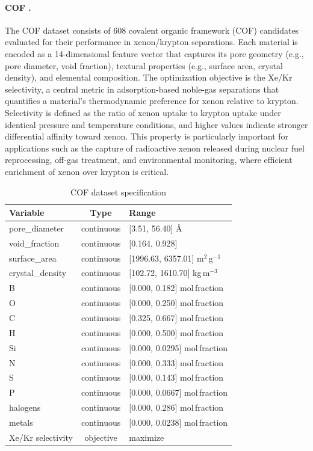 \documentclass{article} %
\begin{document}
\paragraph{COF \citep{cof}.}
The COF dataset consists of 608 covalent organic framework (COF) candidates evaluated for their performance in xenon/krypton separations. Each material is encoded as a 14-dimensional feature vector that captures its pore geometry (e.g., pore diameter, void fraction), textural properties (e.g., surface area, crystal density), and elemental composition. The optimization objective is the Xe/Kr selectivity, a central metric in adsorption-based noble-gas separations that quantifies a material's thermodynamic preference for xenon relative to krypton. Selectivity is defined as the ratio of xenon uptake to krypton uptake under identical pressure and temperature conditions, and higher values indicate stronger differential affinity toward xenon. This property is particularly important for applications such as the capture of radioactive xenon released during nuclear fuel reprocessing, off-gas treatment, and environmental monitoring, where efficient enrichment of xenon over krypton is critical.

\begin{table}[h]
\centering
\caption{COF dataset specification}
\begin{tabular}{lcl}
\toprule
Variable & Type & Range \\
\midrule
pore\_diameter    & continuous & [3.51, 56.40] \AA \\
void\_fraction    & continuous & [0.164, 0.928]\\
surface\_area     & continuous & [1996.63, 6357.01] m$^{2}$\,g$^{-1}$ \\
crystal\_density  & continuous & [102.72, 1610.70] kg\,m$^{-3}$ \\
B                 & continuous & [0.000, 0.182] mol\,fraction \\
O                 & continuous & [0.000, 0.250] mol\,fraction \\
C                 & continuous & [0.325, 0.667] mol\,fraction \\
H                 & continuous & [0.000, 0.500] mol\,fraction \\
Si                & continuous & [0.000, 0.0295] mol\,fraction \\
N                 & continuous & [0.000, 0.333] mol\,fraction \\
S                 & continuous & [0.000, 0.143] mol\,fraction \\
P                 & continuous & [0.000, 0.0667] mol\,fraction \\
halogens          & continuous & [0.000, 0.286] mol\,fraction \\
metals            & continuous & [0.000, 0.0238] mol\,fraction \\
\midrule
Xe/Kr selectivity & objective & maximize \\
\bottomrule
\end{tabular}
\label{tab:cof_dataset_spec}
\end{table}
\end{document}
